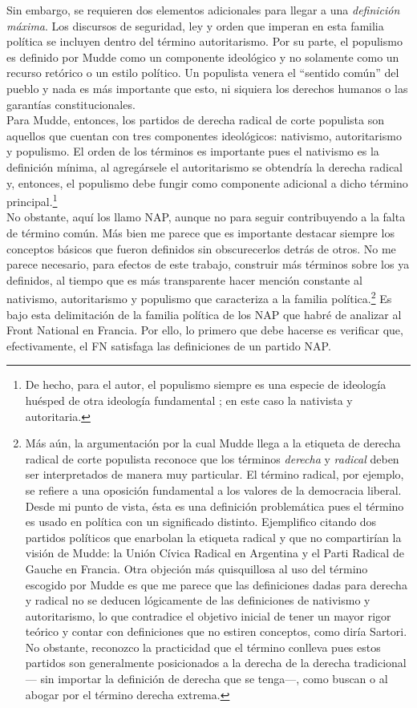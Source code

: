 Sin embargo, se requieren dos elementos adicionales para llegar a una \textit{definición máxima}. Los discursos de seguridad, ley y orden que imperan en esta familia política se incluyen dentro del término autoritarismo. Por su parte, el populismo es definido por Mudde como un componente ideológico y no solamente como un recurso retórico o un estilo político. Un populista venera el ``sentido común'' del pueblo y nada es más importante que esto, ni siquiera los derechos humanos o las garantías constitucionales.\\

Para Mudde, entonces, los partidos de derecha radical de corte populista son aquellos que cuentan con tres componentes ideológicos: nativismo, autoritarismo y populismo. El orden de los términos es importante pues el nativismo es la definición mínima, al agregársele el autoritarismo se obtendría la derecha radical y, entonces, el populismo debe fungir como componente adicional a dicho término principal.\footnote{De hecho, para el autor, el populismo siempre es una especie de ideología huésped de otra ideología fundamental \parencite{MuddeRovira17}; en este caso la nativista y autoritaria.}\\ 

No obstante, aquí los llamo NAP, aunque no para seguir contribuyendo a la falta de término común. Más bien me parece que es importante destacar siempre los conceptos básicos que fueron definidos sin obscurecerlos detrás de otros. No me parece necesario, para efectos de este trabajo, construir más términos sobre los ya definidos, al tiempo que es más transparente hacer mención constante al nativismo, autoritarismo y populismo que caracteriza a la familia política.\footnote{Más aún, la argumentación por la cual Mudde llega a la etiqueta de derecha radical de corte populista reconoce que los términos \textit{derecha} y \textit{radical} deben ser interpretados de manera muy particular. El término radical, por ejemplo, se refiere a una oposición fundamental a los valores de la democracia liberal. Desde mi punto de vista, ésta es una definición problemática pues el término es usado en política con un significado distinto. Ejemplifico citando dos partidos políticos que enarbolan la etiqueta radical y que no compartirían la visión de Mudde: la Unión Cívica Radical en Argentina y el Parti Radical de Gauche en Francia. Otra objeción más quisquillosa al uso del término escogido por Mudde es que me parece que las definiciones dadas para derecha y radical no se deducen lógicamente de las definiciones de nativismo y autoritarismo, lo que contradice el objetivo inicial de tener un mayor rigor teórico y contar con definiciones que no estiren conceptos, como diría Sartori. No obstante, reconozco la practicidad que el término conlleva pues estos partidos son generalmente posicionados a la derecha de la derecha tradicional--- sin importar la definición de derecha que se tenga---, como buscan \textcite{Mammone12} o \textcite{Hainsworth16a} al abogar por el término derecha extrema.} Es bajo esta delimitación de la familia política de los NAP que habré de analizar al Front National en Francia. Por ello, lo primero que debe hacerse es verificar que, efectivamente, el FN satisfaga las definiciones de un partido NAP.\\ 


